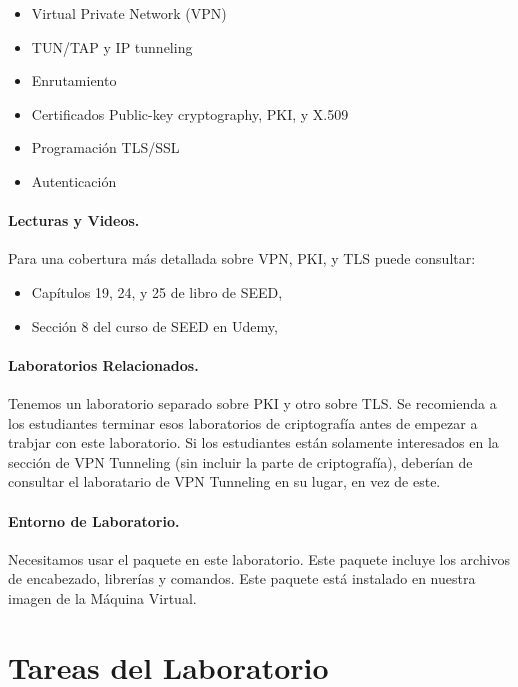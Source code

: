 \begin{itemize}[noitemsep]
\item Virtual Private Network (VPN)
\item TUN/TAP y IP tunneling 
\item Enrutamiento
\item Certificados Public-key cryptography, PKI, y X.509 
\item Programación TLS/SSL
\item Autenticación
\end{itemize}


\paragraph{Lecturas y Videos.}
Para una cobertura más detallada sobre VPN, PKI, y TLS puede consultar:

\begin{itemize}
\item Capítulos 19, 24, y 25 de libro de SEED, \seedbook
\item Sección 8 del curso de SEED en Udemy, \seedisvideo
\end{itemize}


\paragraph{Laboratorios Relacionados.}
Tenemos un laboratorio separado sobre PKI y otro sobre TLS. Se recomienda a los estudiantes terminar esos laboratorios de criptografía antes de empezar a trabjar con este laboratorio. Si los estudiantes están solamente interesados en la sección de VPN Tunneling (sin incluir la parte de criptografía), deberían de consultar el laboratario de VPN Tunneling en su lugar, en vez de este.

\paragraph{Entorno de Laboratorio.} 
\seedenvironmentB
Necesitamos usar el paquete \openssl en este laboratorio. Este paquete incluye los archivos de encabezado, librerías y comandos. Este paquete está instalado en nuestra imagen de la Máquina Virtual.




\newpage
\section{Tareas del Laboratorio}

